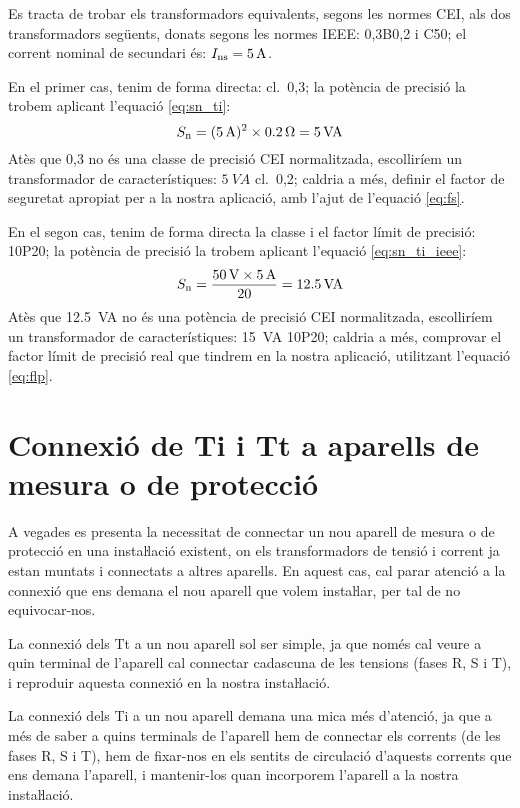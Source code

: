 \begin{exemple}[\TrafoIeeeEqCei{}]
	\addcontentsxms{\TrafoIeeeEqCei}
    Es tracta de trobar els transformadors equivalents, segons les normes CEI, als dos
    transformadors següents, donats segons les normes IEEE: 0,3B0,2 i
    C50; el corrent nominal de secundari és:    $I_\mathrm{ns}=\qty{5}{A}$.

    En el primer cas, tenim de forma directa: cl.~0,3; la potència de precisió la trobem
    aplicant l'equació \eqref{eq:sn_ti}:
    \[
        S_\mathrm{n} =(\qty{5}{A})^2 \times \qty{0,2}{\ohm} =  \qty{5}{VA}
    \]
    Atès que 0,3 no és una classe de precisió CEI normalitzada,
    escolliríem un transformador de característiques: $\qty{5}{VA}$ cl.~0,2; caldria a més, definir el factor de
    seguretat apropiat per a la nostra aplicació, amb l'ajut de l'equació \eqref{eq:fs}.

    En el segon cas, tenim de forma directa la classe i el factor límit de
    precisió: 10P20; la potència de precisió la trobem
    aplicant l'equació \eqref{eq:sn_ti_ieee}:
    \[
        S_\mathrm{n} = \frac{\qty{50}{V} \times\qty{5}{A}}{20} = \qty{12,5}{VA}
    \]
    Atès que \SI{12,5}{VA} no és una potència de precisió CEI normalitzada,
     escolliríem un transformador de característiques:
    \SI{15}{VA} 10P20; caldria a més, comprovar el factor límit de precisió real
    que tindrem en la nostra aplicació, utilitzant l'equació \eqref{eq:flp}.
\end{exemple}

\section{Connexió de Ti i Tt a aparells de mesura o de
protecció}\label{sec:conex_ti_tt}

A vegades es presenta la necessitat de connectar un nou aparell de
mesura o de protecció en una instaŀlació existent, on els
transformadors de tensió i corrent ja estan muntats i connectats a
altres aparells. En aquest cas, cal parar atenció a la connexió
que ens demana el nou aparell que volem instaŀlar, per tal de no
equivocar-nos.

La connexió dels Tt a un nou aparell sol ser simple, ja que només
cal veure a quin terminal de l'aparell cal connectar cadascuna de
les tensions (fases R, S i T), i reproduir aquesta connexió en la
nostra instaŀlació.

La connexió dels Ti a un nou aparell demana una mica més
d'atenció, ja que a més de saber a  quins terminals de l'aparell hem
de connectar els corrents (de les fases R, S i T), hem de fixar-nos
en els sentits de circulació d'aquests corrents que ens demana
l'aparell, i mantenir-los quan incorporem l'aparell a la nostra
instaŀlació.

